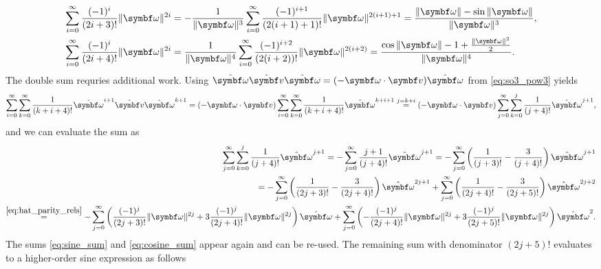\begin{subequations}
  \begin{align}
    \label{eq:sine_sum}
    \sum_{i=0}^\infty \frac{(-1)^i}{(2i+3)!} \| \bomega \|^{2i}   & = - \frac{1}{\| \bomega \|^3} \sum_{i=0}^\infty \frac{(-1)^{i+1}}{(2(i+1)+1)!} \| \bomega \|^{2(i+1) + 1} = \frac{\| \bomega \| - \sin \| \bomega \|}{\| \bomega \|^3} ,         \\
    \label{eq:cosine_sum}
    \sum_{i=0}^\infty \frac{(-1)^{i}}{(2i+4)!} \| \bomega \|^{2i} & = \frac{1}{\| \bomega \|^4} \sum_{i=0}^\infty \frac{(-1)^{i+2}}{(2(i+2))!} \| \bomega \|^{2(i + 2)} =  \frac{\cos \| \bomega \| - 1 + \frac{\|\bomega\|^2}{2}}{\| \bomega \|^4}.
  \end{align}
\end{subequations}
The double sum requries additional work. Using $\hat \bomega \hat \bv \hat \bomega = (-\bomega \cdot \bv) \hat \bomega$ from \eqref{eq:so3_pow3} yields
\begin{equation*}
  \sum_{i = 0}^\infty \sum_{k = 0}^\infty \frac{1}{(k+i+4)!} \hat \bomega^{i+1} \hat \bv \hat \bomega^{k+1} = (-\bomega \cdot \bv) \sum_{i = 0}^\infty \sum_{k = 0}^\infty \frac{1}{(k+i+4)!} \hat \bomega^{k+i+1}  \overset{j = k+i}=  (-\bomega \cdot \bv) \sum_{j = 0}^\infty \sum_{k = 0}^{j} \frac{1}{(j+4)!} \hat \bomega^{j+1},
\end{equation*}
and we can evaluate the sum as
\begin{equation*}
  \begin{aligned}
    \sum_{j=0}^\infty \sum_{k=0}^j \frac{1}{(j+4)!} \hat \bomega^{j+1} = - \sum_{j = 0}^\infty \frac{j+1}{(j+4)!} \hat \bomega^{j+1} = - \sum_{j=0}^\infty \left(\frac{1}{(j+3)!} - \frac{3}{(j+4)!} \right) \hat \bomega^{j+1} \\
    = - \sum_{j=0}^\infty \left(\frac{1}{(2j+3)!} - \frac{3}{(2j+4)!} \right) \hat \bomega^{2j+1} + \sum_{j=0}^\infty \left(\frac{1}{(2j+4)!} - \frac{3}{(2j+5)!} \right) \hat \bomega^{2j+2}                                   \\
    \overset{\eqref{eq:hat_parity_rels}}=   -\sum_{j=0}^\infty \left(\frac{(-1)^j  }{(2j+3)!}\| \bomega \|^{2j} + 3\frac{(-1)^j }{(2j+4)!} \| \bomega \|^{2j}\right)  \hat \bomega + \sum_{j=0}^\infty \left(-\frac{(-1)^j  }{(2j+4)!} \| \bomega \|^{2j} + 3\frac{(-1)^j  }{(2j+5)!}\| \bomega \|^{2j} \right) \hat \bomega^2 .
  \end{aligned}
\end{equation*}
The sums \eqref{eq:sine_sum} and \eqref{eq:cosine_sum} appear again and can be re-used. The remaining sum with denominator $(2j+5)!$ evaluates to a higher-order sine expression as follows
